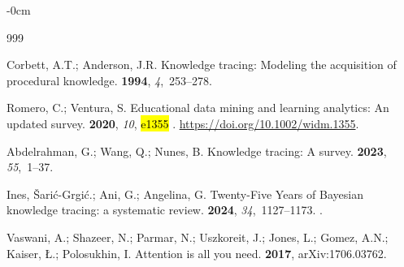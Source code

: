 \documentclass[applsci,article,accept,moreauthors,pdftex]{Definitions/mdpi}
\begin{document}
\begin{adjustwidth}{-\extralength}{0cm}



\begin{thebibliography}{999}

Corbett, A.T.; Anderson, J.R.
\newblock Knowledge tracing: Modeling the acquisition of procedural knowledge.
 {\bf 1994}, {\em
  4},~253--278.

Romero, C.; Ventura, S.
\newblock Educational data mining and learning analytics: An updated survey.
 {\bf 2020}, {\em 10}, \hl{e1355}%
.
  {\url{https://doi.org/10.1002/widm.1355}}.

Abdelrahman, G.; Wang, Q.; Nunes, B.
\newblock Knowledge tracing: A survey.
 {\bf 2023}, {\em 55},~1--37.

Ines, {\v{S}ari\'c-Grgi\'c}.; Ani, G.; Angelina, G.
\newblock Twenty-Five Years of Bayesian knowledge tracing: a systematic review.
 {\bf 2024}, {\em
  34},~1127–1173.
.

Vaswani, A.; Shazeer, N.; Parmar, N.; Uszkoreit, J.; Jones, L.; Gomez, A.N.;
  Kaiser, {\L}.; Polosukhin, I.
\newblock Attention is all you need.
 {\bf 2017},
 arXiv:1706.03762.


\end{thebibliography}
\end{adjustwidth}
\end{document}
